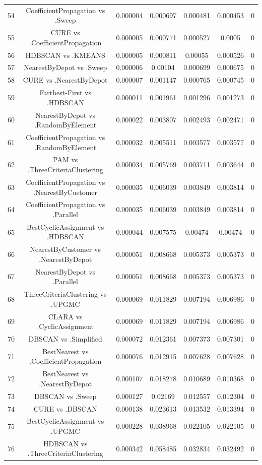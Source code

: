 \documentclass[a4paper,10pt]{article}
\begin{document}
\begin{landscape}
\begin{table}[!htp]
\begin{tabular}{ccccccc}
54&CoefficientPropagation vs .Sweep&0.000004&0.000697&0.000481&0.000453&0\\
55&CURE vs .CoefficientPropagation&0.000005&0.000771&0.000527&0.0005&0\\
56&HDBSCAN vs .KMEANS&0.000005&0.000811&0.00055&0.000526&0\\
57&NearestByDepot vs .Sweep&0.000006&0.00104&0.000699&0.000675&0\\
58&CURE vs .NearestByDepot&0.000007&0.001147&0.000765&0.000745&0\\
59&Farthest-First vs .HDBSCAN&0.000011&0.001961&0.001296&0.001273&0\\
60&NearestByDepot vs .RandomByElement&0.000022&0.003807&0.002493&0.002471&0\\
61&CoefficientPropagation vs .RandomByElement&0.000032&0.005511&0.003577&0.003577&0\\
62&PAM vs .ThreeCriteriaClustering&0.000034&0.005769&0.003711&0.003644&0\\
63&CoefficientPropagation vs .NearestByCustomer&0.000035&0.006039&0.003849&0.003814&0\\
64&CoefficientPropagation vs .Parallel&0.000035&0.006039&0.003849&0.003814&0\\
65&BestCyclicAssignment vs .HDBSCAN&0.000044&0.007575&0.00474&0.00474&0\\
66&NearestByCustomer vs .NearestByDepot&0.000051&0.008668&0.005373&0.005373&0\\
67&NearestByDepot vs .Parallel&0.000051&0.008668&0.005373&0.005373&0\\
68&ThreeCriteriaClustering vs .UPGMC&0.000069&0.011829&0.007194&0.006986&0\\
69&CLARA vs .CyclicAssignment&0.000069&0.011829&0.007194&0.006986&0\\
70&DBSCAN vs .Simplified&0.000072&0.012361&0.007373&0.007301&0\\
71&BestNearest vs .CoefficientPropagation&0.000076&0.012915&0.007628&0.007628&0\\
72&BestNearest vs .NearestByDepot&0.000107&0.018278&0.010689&0.010368&0\\
73&DBSCAN vs .Sweep&0.000127&0.02169&0.012557&0.012304&0\\
74&CURE vs .DBSCAN&0.000138&0.023613&0.013532&0.013394&0\\
75&BestCyclicAssignment vs .UPGMC&0.000228&0.038968&0.022105&0.022105&0\\
76&HDBSCAN vs .ThreeCriteriaClustering&0.000342&0.058485&0.032834&0.032492&0\\

\end{tabular}
\end{table}
\end{landscape}
\end{document}

